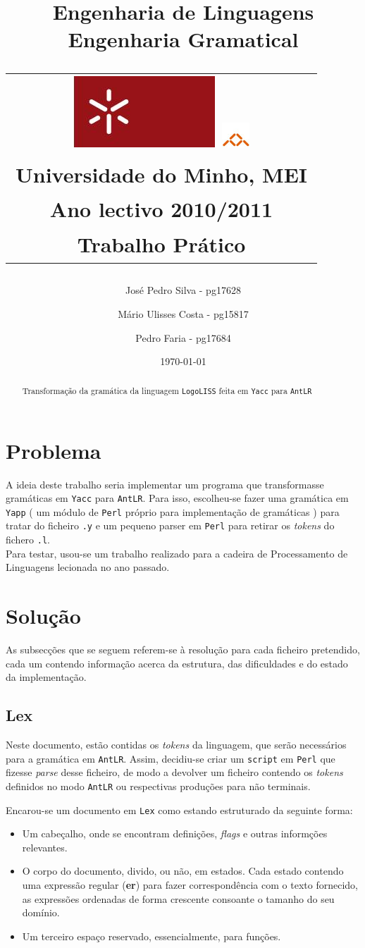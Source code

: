 \documentclass[11pt,a4paper]{article}
\title{\sf  Engenharia de Linguagens \\ Engenharia Gramatical \\
\begin{tabular}{c}
    \includegraphics[width=.1\textwidth]{stuff/uminho.jpg}
    \includegraphics[width=.07\textwidth]{stuff/informatica.jpg}\\
    {\small Universidade do Minho}, {\small MEI}\\
    {\small Ano lectivo 2010/2011}\\
    {\small Trabalho Prático}\\
\end{tabular}
}
\author{
    {\small José Pedro Silva - pg17628} \and
    {\small Mário Ulisses Costa - pg15817} \and
    {\small Pedro Faria - pg17684}}
\date{{\small \today}}
\begin{document}
\maketitle

\begin{abstract}
Transformação da gramática da linguagem \texttt{LogoLISS} feita em \texttt{Yacc} para \texttt{AntLR} 
\end{abstract}

\tableofcontents

\newpage
\section{Problema}
A ideia deste trabalho seria implementar um programa que transformasse gramáticas em \texttt{Yacc} para \texttt{AntLR}. Para isso, escolheu-se fazer uma gramática em 
\texttt{Yapp} ( um módulo de \texttt{Perl} próprio para implementação de gramáticas ) para tratar do ficheiro \texttt{.y} e um pequeno parser em \texttt{Perl} para retirar os 
\emph{tokens} do fichero \texttt{.l}. \\

Para testar, usou-se um trabalho realizado para a cadeira de Processamento de Linguagens lecionada no ano passado. 

\section{Solução}

As subsecções que se seguem referem-se à resolução para cada ficheiro pretendido, cada um contendo informação acerca da estrutura, das dificuldades e 
do estado da implementação.

\subsection{Lex}
Neste documento, estão contidas os \emph{tokens} da linguagem, que serão necessários para a gramática em \texttt{AntLR}. Assim, decidiu-se criar um \texttt{script} em \texttt{Perl}
que fizesse \emph{parse} desse ficheiro, de modo a devolver um ficheiro contendo os \emph{tokens} definidos no modo \texttt{AntLR} ou respectivas produções para não terminais.

Encarou-se um documento em \texttt{Lex} como estando estruturado da seguinte forma:\\

\begin{itemize}
 \item Um cabeçalho, onde se encontram definições, \emph{flags} e outras informções relevantes.
 \item O corpo do documento, divido, ou não, em estados. Cada estado contendo uma expressão regular (\textbf{er}) para fazer correspondência com o texto fornecido, as expressões
 ordenadas de forma crescente consoante o tamanho do seu domínio.
 \item Um terceiro espaço reservado, essencialmente, para funções.
\end{itemize}
\end{document}
